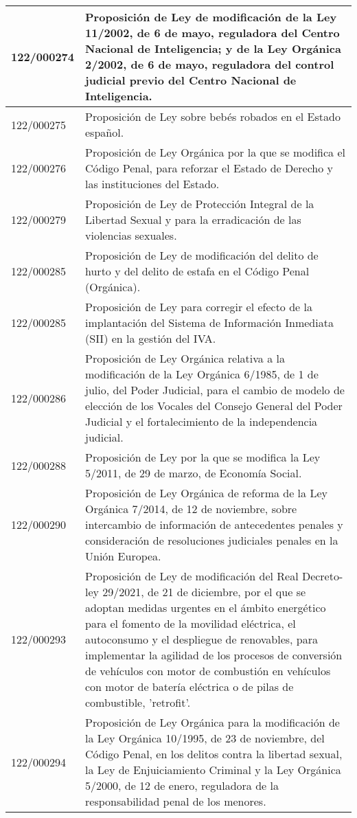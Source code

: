 {\begin{table}[H]
\begin{center}
\begin{tabularx}{\linewidth}{| l | X |}
\hline
122/000274 & Proposición de Ley de modificación de la Ley 11/2002, de 6 de mayo, reguladora del Centro Nacional de Inteligencia; y de la Ley Orgánica 2/2002, de 6 de mayo, reguladora del control judicial previo del Centro Nacional de Inteligencia. \\
\hline
122/000275 & Proposición de Ley sobre bebés robados en el Estado español. \\
\hline
122/000276 & Proposición de Ley Orgánica por la que se modifica el Código Penal, para reforzar el Estado de Derecho y las instituciones del Estado. \\
\hline
122/000279 & Proposición de Ley de Protección Integral de la Libertad Sexual y para la erradicación de las violencias sexuales. \\
\hline
122/000285 & Proposición de Ley de modificación del delito de hurto y del delito de estafa en el Código Penal (Orgánica). \\
\hline
122/000285 & Proposición de Ley para corregir el efecto de la implantación del Sistema de Información Inmediata (SII) en la gestión del IVA. \\
\hline
122/000286 & Proposición de Ley Orgánica relativa a la modificación de la Ley Orgánica 6/1985, de 1 de julio, del Poder Judicial, para el cambio de modelo de elección de los Vocales del Consejo General del Poder Judicial y el fortalecimiento de la independencia judicial. \\
\hline
122/000288 & Proposición de Ley por la que se modifica la Ley 5/2011, de 29 de marzo, de Economía Social. \\
\hline
122/000290 & Proposición de Ley Orgánica de reforma de la Ley Orgánica 7/2014, de 12 de noviembre, sobre intercambio de información de antecedentes penales y consideración de resoluciones judiciales penales en la Unión Europea. \\
\hline
122/000293 & Proposición de Ley de modificación del Real Decreto-ley 29/2021, de 21 de diciembre, por el que se adoptan medidas urgentes en el ámbito energético para el fomento de la movilidad eléctrica, el autoconsumo y el despliegue de renovables, para implementar la agilidad de los procesos de conversión de vehículos con motor de combustión en vehículos con motor de batería eléctrica o de pilas de combustible, 'retrofit'. \\
\hline
122/000294 & Proposición de Ley Orgánica para la modificación de la Ley Orgánica 10/1995, de 23 de noviembre, del Código Penal, en los delitos contra la libertad sexual, la Ley de Enjuiciamiento Criminal y la Ley Orgánica 5/2000, de 12 de enero, reguladora de la responsabilidad penal de los menores. \\

\end{tabularx}
\end{center}
\end{table}}
